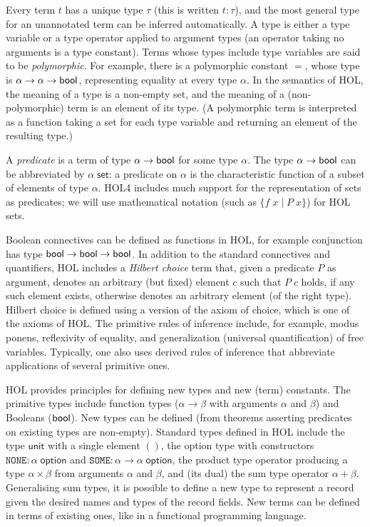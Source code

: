 \documentclass[twoside,titlepage,11pt]{article}
\begin{document}
Every term $t$ has a unique type $\tau$ (this is written $t:\tau$), and the most general type for an unannotated term can be inferred automatically.
A type is either a type variable or a type operator applied to argument types (an operator taking no arguments is a type constant).
Terms whose types include type variables are said to be \emph{polymorphic}.
For example, there is a polymorphic constant $=$, whose type is $\alpha\to\alpha\to\mathsf{bool}$, representing equality at every type $\alpha$.
In the semantics of HOL, the meaning of a type is a non-empty set, and the meaning of a (non-polymorphic) term is an element of its type.
(A polymorphic term is interpreted as a function taking a set for each type variable and returning an element of the resulting type.)

A \emph{predicate} is a term of type $\alpha\to\mathsf{bool}$ for some type $\alpha$.
The type $\alpha\to\mathsf{bool}$ can be abbreviated by $\alpha\;\mathsf{set}$: a predicate on $\alpha$ is the characteristic function of a subset of elements of type $\alpha$.
HOL4 includes much support for the representation of sets as predicates; we will use mathematical notation (such as $\{f\;x\mid P\;x\}$) for HOL sets.

Boolean connectives can be defined as functions in HOL, for example conjunction has type $\mathsf{bool}\to\mathsf{bool}\to\mathsf{bool}$.
In addition to the standard connectives and quantifiers, HOL includes a \emph{Hilbert choice} term that, given a predicate $P$ as argument, denotes an arbitrary (but fixed) element $c$ such that $P\; c$ holds, if any such element exists, otherwise denotes an arbitrary element (of the right type).
Hilbert choice is defined using a version of the axiom of choice, which is one of the axioms of HOL.
The primitive rules of inference include, for example, modus ponens, reflexivity of equality, and generalization (universal quantification) of free variables.
Typically, one also uses derived rules of inference that abbreviate applications of several primitive ones.

HOL provides principles for defining new types and new (term) constants.
The primitive types include function types ($\alpha\to\beta$ with arguments $\alpha$ and $\beta$) and Booleans ($\mathsf{bool}$).
New types can be defined (from theorems asserting predicates on existing types are non-empty).
Standard types defined in HOL include the type $\mathsf{unit}$ with a single element $()$, the option type with constructors $\mathtt{NONE}:\alpha\;\mathsf{option}$ and $\mathtt{SOME}:\alpha\to\alpha\;\mathsf{option}$, the product type operator producing a type $\alpha\times\beta$ from arguments $\alpha$ and $\beta$, and (its dual) the sum type operator $\alpha+\beta$.
Generalising sum types, it is possible to define a new type to represent a record given the desired names and types of the record fields.
New terms can be defined in terms of existing ones, like in a functional programming language.
\end{document}
